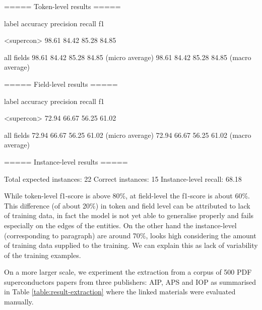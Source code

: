 \documentclass{article}[a4]
\begin{document}
\begin{verbnobox}[\small]
===== Token-level results =====

label                accuracy     precision    recall       f1     

<supercon>           98.61        84.42        85.28        84.85  

all fields           98.61        84.42        85.28        84.85   (micro average)
                     98.61        84.42        85.28        84.85   (macro average)

===== Field-level results =====

label                accuracy     precision    recall       f1     

<supercon>           72.94        66.67        56.25        61.02  

all fields           72.94        66.67        56.25        61.02   (micro average)
                     72.94        66.67        56.25        61.02   (macro average)

===== Instance-level results =====

Total expected instances:   22
Correct instances:          15
Instance-level recall:      68.18
\end{verbnobox}

While token-level f1-score is above 80\%, at field-level the f1-score is about 60\%. This difference (of about 20\%) in token and field level can be attributed to lack of training data, in fact the model is not yet able to generalise properly and fails especially on the edges of the entities. 
On the other hand the instance-level (corresponding to paragraph) are around 70\%, looks high considering the amount of training data supplied to the training. We can explain this as lack of variability of the training examples. 


On a more larger scale, we experiment the extraction from a corpus of 500 PDF superconductors papers from three publishers: AIP, APS and IOP as summarised in Table \ref{table:result-extraction} where the linked materials were evaluated manually. 
\end{document}
